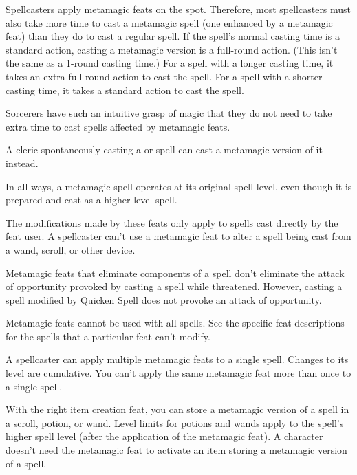  Spellcasters apply metamagic feats on the spot. Therefore, most spellcasters must also take more time to cast a metamagic spell (one enhanced by a metamagic feat) than they do to cast a regular spell. If the spell's normal casting time is a standard action, casting a metamagic version is a full-round action. (This isn't the same as a 1-round casting time.) For a spell with a longer casting time, it takes an extra full-round action to cast the spell. For a spell with a shorter casting time, it takes a standard action to cast the spell.

\par Sorcerers have such an intuitive grasp of magic that they do not need to take extra time to cast spells affected by metamagic feats.

 A cleric spontaneously casting a  or  spell can cast a metamagic version of it instead.

 In all ways, a metamagic spell operates at its original spell level, even though it is prepared and cast as a higher-level spell.

The modifications made by these feats only apply to spells cast directly by the feat user. A spellcaster can't use a metamagic feat to alter a spell being cast from a wand, scroll, or other device.

Metamagic feats that eliminate components of a spell don't eliminate the attack of opportunity provoked by casting a spell while threatened. However, casting a spell modified by Quicken Spell does not provoke an attack of opportunity.

Metamagic feats cannot be used with all spells. See the specific feat descriptions for the spells that a particular feat can't modify.

 A spellcaster can apply multiple metamagic feats to a single spell. Changes to its level are cumulative. You can't apply the same metamagic feat more than once to a single spell.

 With the right item creation feat, you can store a metamagic version of a spell in a scroll, potion, or wand. Level limits for potions and wands apply to the spell's higher spell level (after the application of the metamagic feat). A character doesn't need the metamagic feat to activate an item storing a metamagic version of a spell.

